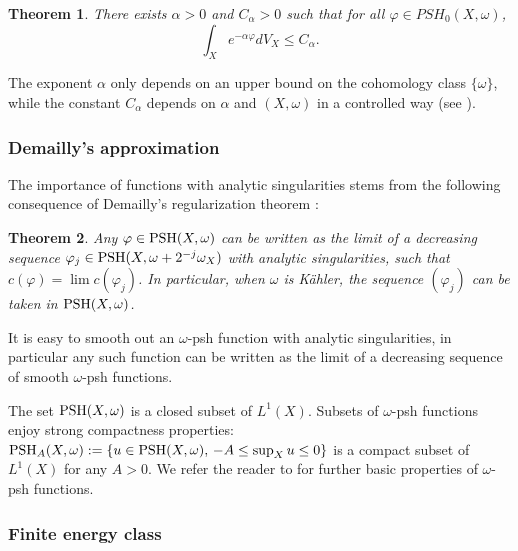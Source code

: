 \documentclass[11pt]{amsart}
\numberwithin{equation}{section}
\newtheorem{theorem}{Theorem}[section]
\newcommand{\PSH}{\textup{PSH}}
\newcommand{\f}{\varphi}
\begin{document}
 
\begin{theorem} \label{thm:skoda}
There exists $\alpha>0$ and $C_{\alpha} >0$ such that for all $\f \in PSH_0(X,\omega)$,
$$
\int_X e^{-\alpha \f} dV_X \leq C_{\alpha}.
$$
\end{theorem}

The exponent $\alpha$ only depends on an upper bound on the cohomology class $\{\omega\}$, while
the constant $C_{\alpha}$ depends on $\alpha$ and $(X,\omega)$ in a controlled way
(see \cite[Theorem 2.9]{DGG23}).

 
\subsubsection*{Demailly's approximation}

The importance of functions with analytic singularities stems from the following consequence of 
Demailly's regularization theorem \cite{DPS01}: 

\begin{theorem} \label{thm:Demreg} 
Any $\f\in\PSH(X,\omega)$ can be written as the limit of a decreasing sequence $\f_j\in\PSH(X,\omega+2^{-j}\omega_X)$ with analytic singularities, 
such that $c(\f)=\lim c(\f_j)$. In particular, when $\omega$ is K\"ahler, the sequence $(\varphi_j)$ can be taken in $\PSH(X,\omega)$. 
\end{theorem}

It is easy to smooth out an $\omega$-psh function with analytic singularities, in particular
any such function can be written as the limit of a decreasing sequence of smooth $\omega$-psh functions.

\smallskip


The set $\PSH(X,\omega)$ is a closed subset of $L^1(X)$.
Subsets of  $\omega$-psh functions enjoy strong compactness  properties:
$
\PSH_A(X,\omega):=\{ u \in\PSH(X,\omega), \, -A \leq \sup_X u \leq 0 \} 
$
is a compact subset of $L^1(X)$ for any $A>0$.
We refer the reader to \cite{GZbook} for further basic properties of $\omega$-psh functions.



\subsubsection*{Finite energy class}
\end{document}
